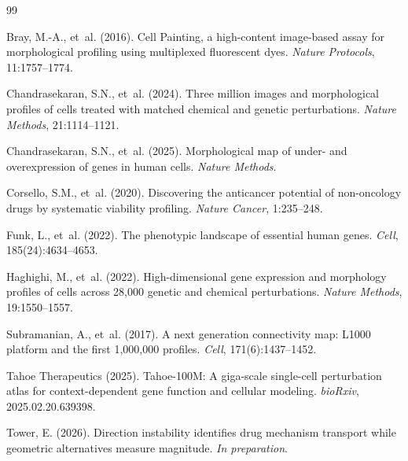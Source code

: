 \documentclass[11pt]{article}
\begin{document}
\begin{thebibliography}{99}

Bray, M.-A., et~al. (2016).
Cell Painting, a high-content image-based assay for morphological profiling using multiplexed fluorescent dyes.
\textit{Nature Protocols}, 11:1757--1774.

Chandrasekaran, S.N., et~al. (2024).
Three million images and morphological profiles of cells treated with matched chemical and genetic perturbations.
\textit{Nature Methods}, 21:1114--1121.

Chandrasekaran, S.N., et~al. (2025).
Morphological map of under- and overexpression of genes in human cells.
\textit{Nature Methods}.

Corsello, S.M., et~al. (2020).
Discovering the anticancer potential of non-oncology drugs by systematic viability profiling.
\textit{Nature Cancer}, 1:235--248.

Funk, L., et~al. (2022).
The phenotypic landscape of essential human genes.
\textit{Cell}, 185(24):4634--4653.

Haghighi, M., et~al. (2022).
High-dimensional gene expression and morphology profiles of cells across 28,000 genetic and chemical perturbations.
\textit{Nature Methods}, 19:1550--1557.

Subramanian, A., et~al. (2017).
A next generation connectivity map: L1000 platform and the first 1,000,000 profiles.
\textit{Cell}, 171(6):1437--1452.

Tahoe Therapeutics (2025).
Tahoe-100M: A giga-scale single-cell perturbation atlas for context-dependent gene function and cellular modeling.
\textit{bioRxiv}, 2025.02.20.639398.

Tower, E. (2026).
Direction instability identifies drug mechanism transport while geometric alternatives measure magnitude.
\textit{In preparation}.

\end{thebibliography}
\end{document}
